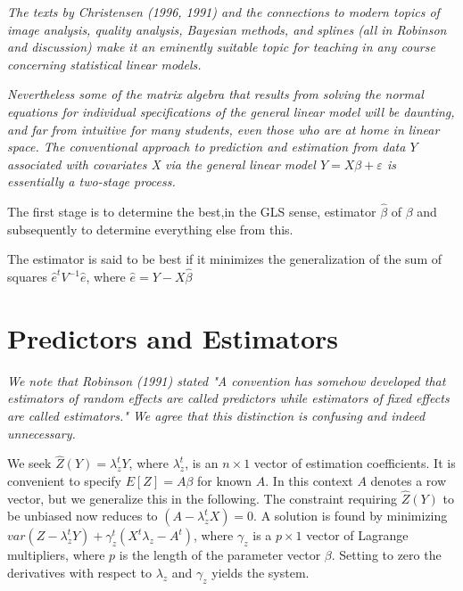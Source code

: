 \documentclass[12pt, a4paper]{article}
\begin{document}
\emph{ The texts by Christensen (1996, 1991) and the connections to modern topics of image analysis, quality analysis, Bayesian methods, and splines (all in Robinson and discussion) make it an eminently suitable topic for teaching in any course concerning statistical linear models. }


\emph{Nevertheless some of the matrix algebra that results from solving the normal equations for individual specifications of the general linear model will be daunting, and far from intuitive for many students, even those who are at home in linear space. The conventional approach to prediction and estimation from data $Y$ associated with covariates X via the general linear model $Y = X\beta + \varepsilon$ is essentially a two-stage process.}

The first stage is to determine the best,in the GLS sense, estimator $\hat{\beta}$ of $\beta$ and subsequently to determine everything else from this.

The estimator is said to be best if it minimizes the generalization of the sum of squares $\hat{e}^{t}V^{-1}\hat{e}$, where $\hat{e} = Y- X\hat{\beta}$

\section{Predictors and Estimators}

\emph{We note that Robinson (1991) stated "A convention has somehow developed that estimators of random effects are called predictors while estimators of fixed effects are called estimators." We agree that this distinction is confusing and indeed unnecessary.} \\ \bigskip



We seek $\hat{Z}(Y) = \lambda_{z}^{t}Y$, where $ \lambda_{z}^{t}$, is an $n \times 1$ vector of estimation coefficients. It is convenient to specify $E[Z]=A\beta$ for known $A$. In this context $A$ denotes a row vector, but we generalize this in the following. The constraint requiring $\hat{Z}(Y)$ to be unbiased now reduces to $(A -  \lambda_{z}^{t}X) = 0$. A solution is found by minimizing $var(Z -  \lambda_{z}^{t}Y) + \gamma^t_z (X^t\lambda_{z} - A^t)$, where $\gamma_z$ is a $p \times 1$ vector of Lagrange multipliers, where $p$ is the length of the parameter vector $\beta$. Setting to zero the derivatives with respect to $\lambda_{z}$ and $\gamma_z $ yields the system.
\end{document}
